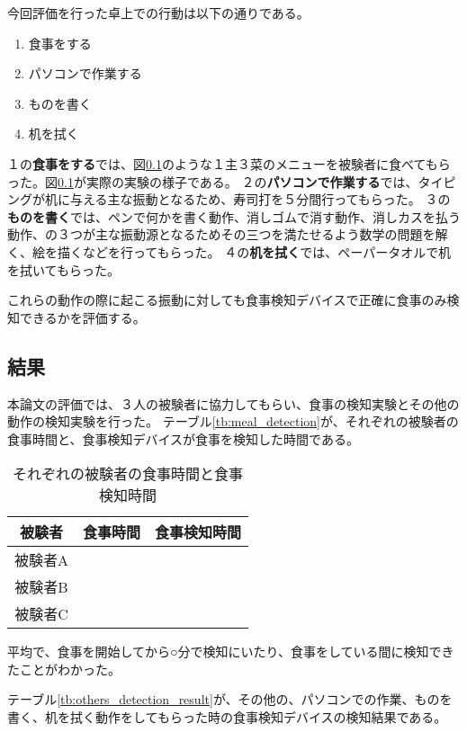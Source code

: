 今回評価を行った卓上での行動は以下の通りである。

\begin{enumerate}
  \item 食事をする
  \item パソコンで作業する
  \item ものを書く
  \item 机を拭く
\end{enumerate}

１の\textbf{食事をする}では、図\ref{}のような１主３菜のメニューを被験者に食べてもらった。図\ref{}が実際の実験の様子である。
２の\textbf{パソコンで作業する}では、タイピングが机に与える主な振動となるため、寿司打\cite{sushida}を５分間行ってもらった。
３の\textbf{ものを書く}では、ペンで何かを書く動作、消しゴムで消す動作、消しカスを払う動作、の３つが主な振動源となるためその三つを満たせるよう数学の問題を解く、絵を描くなどを行ってもらった。
４の\textbf{机を拭く}では、ペーパータオルで机を拭いてもらった。

これらの動作の際に起こる振動に対しても食事検知デバイスで正確に食事のみ検知できるかを評価する。

\subsection{結果}

本論文の評価では、３人の被験者に協力してもらい、食事の検知実験とその他の動作の検知実験を行った。
テーブル\ref{tb:meal_detection}が、それぞれの被験者の食事時間と、食事検知デバイスが食事を検知した時間である。

\begin{table}[htbp]
  \caption{それぞれの被験者の食事時間と食事検知時間}
  \label{tb:meal_detection_result}
  \begin{center}
    \begin{tabular}{|c||c|c|}
      \hline
      被験者  & 食事時間 & 食事検知時間 \\
      \hline\hline
      被験者A &  & \\\hline
      被験者B &  & \\\hline
      被験者C &  & \\\hline
    \end{tabular}
  \end{center}
\end{table}

平均で、食事を開始してから○分で検知にいたり、食事をしている間に検知できたことがわかった。

テーブル\ref{tb:others_detection_result}が、その他の、パソコンでの作業、ものを書く、机を拭く動作をしてもらった時の食事検知デバイスの検知結果である。

